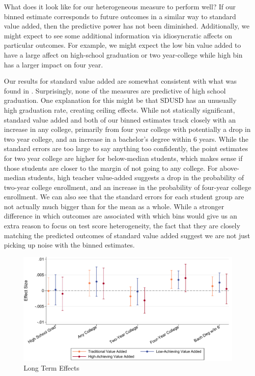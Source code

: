 \documentclass[12pt]{article}
\theoremstyle{definition}
\theoremstyle{definition}
\theoremstyle{definition}
\theoremstyle{definition}
\begin{document}
    What does it look like for our heterogeneous measure to perform well? If our binned estimate corresponds to future outcomes in a similar way to standard value added, then the predictive power has not been diminished. Additionally, we might expect to see some additional information via idiosyncratic affects on particular outcomes. For example, we might expect the low bin value added to have a large affect on high-school graduation or two year-college while high bin has a larger impact on four year. 

    Our results for standard value added are somewhat consistent with what was found in \cite{chetty2014measuring2}. Surprisingly, none of the measures are predictive of high school graduation. One explanation for this might be that SDUSD has an unusually high graduation rate, creating ceiling effects. While not statically significant, standard value added and both of our binned estimates track closely with an increase in any college, primarily from four year college with potentially a drop in two year college, and an increase in a bachelor's degree within 6 years. While the standard errors are too large to say anything too confidently, the point estimates for two year college are higher for below-median students, which makes sense if those students are closer to the margin of not going to any college. For above-median students, high teacher value-added suggests a drop in the probability of two-year college enrollment, and an increase in the probability of four-year college enrollment. We can also see that the standard errors for each student group are not actually much bigger than for the mean as a whole. While a stronger difference in which outcomes are associated with which bins would give us an extra reason to focus on test score heterogeneity, the fact that they are closely matching the predicted outcomes of standard value added suggest we are not just picking up noise with the binned estimates. 

    \begin{figure}[H]
    \begin{center}
    \includegraphics[width=.9\textwidth]{Working_Paper/WP_Figures/fig2b_longterm.pdf}
    \end{center}
        \caption{Long Term Effects}
        \label{fig_long_term}
    \end{figure}
\end{document}
